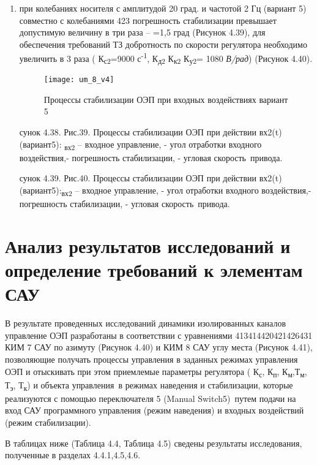 \begin{enumerate}
	\item при  колебаниях носителя с амплитудой 20 град. и частотой 2  Гц (вариант 5) совместно с колебаниями 423 погрешность стабилизации превышает допустимую величину в три раза –   =1,5 град (Рисунок 4.39), для обеспечения требований ТЗ добротность по скорости регулятора необходимо увеличить в 3 раза ( К\textsubscript{с2}=9000 с\textsuperscript{-1}, К\textsubscript{д2 }К\textsubscript{к2} К\textsubscript{у2}=\textit{ }1080 \textit{В/рад}) (Рисунок 4.40).
	
	\begin{figure}[ht]
		\centering
		\texttt{[image: um\_8\_v4]} 
		\caption{Процессы стабилизации ОЭП при входных воздействиях  вариант 5}
		\label{fig:um38}
	\end{figure}
	сунок 4.38. Рис.39. Процессы стабилизации ОЭП при действии вх2(t) (вариант5):	\textsubscript{вх2} – входное управление,  - угол отработки входного воздействия,- погрешность стабилизации,  - угловая скорость\  привода.
	
	сунок 4.39. Рис.40. Процессы стабилизации ОЭП при действии вх2(t) (вариант5):\textsubscript{вх2} – входное управление,  - угол отработки входного воздействия,- погрешность стабилизации,  - угловая скорость\  привода.
\end{enumerate}


\section{Анализ результатов исследований и определение требований к элементам САУ} \label{ch:ch4/sect7}

В результате проведенных исследований динамики изолированных каналов управление ОЭП разработаны в соответствии с уравнениями 413414420421426431 КИМ 7 САУ по азимуту (Рисунок 4.40) и КИМ 8 САУ углу места (Рисунок 4.41), позволяющие получать процессы управления в заданных режимах управления  ОЭП и отыскивать при этом приемлемые параметры регулятора ( К\textsubscript{с}, К\textsubscript{п}, К\textsubscript{м},Т\textsubscript{м}, Т\textsubscript{э}, Т\textsubscript{к}) и объекта управления\ в режимах наведения и стабилизации, которые реализуются с помощью переключателя  5 (Manual Switch5)\ путем подачи на вход  САУ программного управления (режим наведения) и входных воздействий (режим стабилизации).\par

В таблицах ниже (Таблица 4.4, Таблица 4.5) сведены результаты исследования, полученные в разделах 4.4.1,4.5,4.6.

